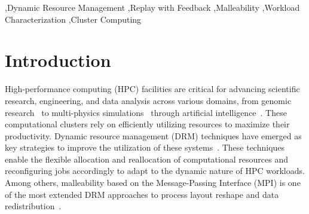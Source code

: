\documentclass[a4paper,fleqn]{cas-dc}
\begin{document}

\begin{keywords}
\sep Dynamic Resource Management
\sep Replay with Feedback
\sep Malleability
\sep Workload Characterization
\sep Cluster Computing
\end{keywords}

\maketitle

\section{Introduction}\label{intro}
High-performance computing (HPC) facilities are critical for advancing scientific research, engineering, and data analysis across various domains, from genomic research~\cite{martinez_dynamic_2013, zhong_gpu_2025} to multi-physics simulations~\cite{hess_gromacs_2008, vazquez_alya_2016, caviedes-voullieme_serghei_2023} through artificial intelligence~\cite{martinez-cuenca_use_2023, rosciszewski_optimizing_2023, godoy_large_2024}. 
These computational clusters rely on efficiently utilizing resources to maximize their productivity. Dynamic resource management (DRM) techniques have emerged as key strategies to improve the utilization of these systems~\cite{bungartz_invasive_2013, garcia_hints_2014, lopez_openmp_2021}. These techniques enable the flexible allocation and reallocation of computational resources and reconfiguring jobs accordingly to adapt to the dynamic nature of HPC workloads.
Among others, malleability based on the Message-Passing Interface (MPI) is one of the most extended DRM approaches to process layout reshape and data redistribution~\cite{martin_flex-mpi_2013, martin-alvarez_proteo_2024, huber_bridging_2025, iserte_resource_2025}.
\end{document}
